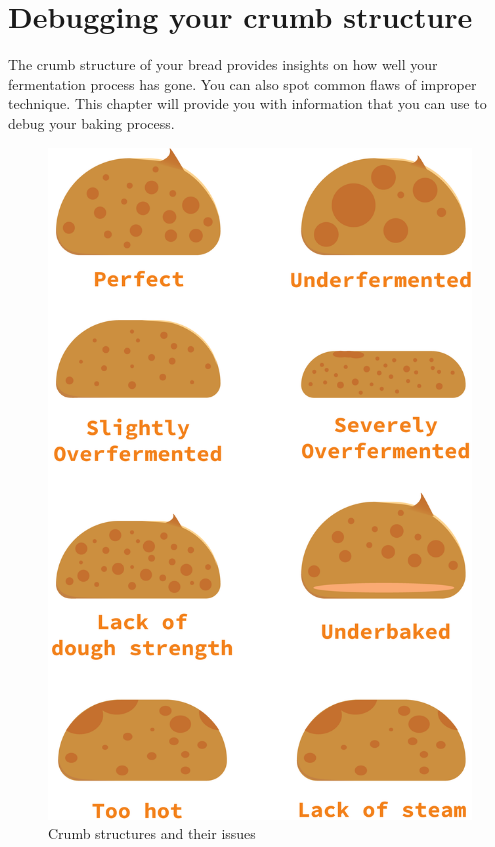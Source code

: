 \section{Debugging your crumb structure}
\label{section:debugging-crumb-strucuture}

The crumb structure of your bread provides insights on how well
your fermentation process has gone. You can also spot common flaws
of improper technique. This chapter will provide you with information
that you can use to debug your baking process.

\begin{figure}
  \includegraphics[width=\textwidth]{crumb-structures-book}
  \caption{Crumb structures and their issues}
  \label{fig:crumb-structures-book}
\end{figure}

